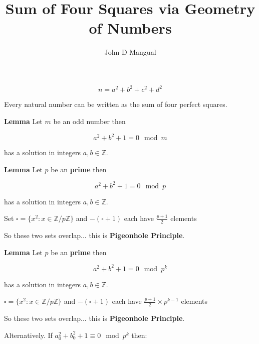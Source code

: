 \documentclass[12pt]{article}
\title{\textbf{ Sum of Four Squares via Geometry of Numbers }}
\author{John D Mangual}
\date{}
\begin{document}
\selectfont \fontsize{25}{30}\selectfont

\maketitle

\noindent $$ n = a^2 + b^2 + c^2 + d^2 $$

\noindent Every natural number can be written as the sum of four perfect squares.

\newpage

\noindent \textbf{Lemma} \newline \newline Let $m$ be an odd number then

$$ a^2 + b^2 + 1 = 0 \mod m $$

\noindent has a solution in integers $a,b \in \mathbb{Z}$.

\newpage

\noindent \textbf{Lemma} \newline \newline Let $p$ be an \textbf{prime} then

$$ a^2 + b^2 + 1 = 0 \mod p $$

\noindent has a solution in integers $a,b \in \mathbb{Z}$. \newline

\noindent Set $\square = \{ x^2 : x \in \mathbb{Z}/p\mathbb{Z} \}$ and $-(\square + 1)$ each have $\frac{p+1}{2}$ elements \newline

\noindent So these two sets overlap... this is \textbf{Pigeonhole Principle}.

\newpage

\noindent \textbf{Lemma} \newline \newline Let $p$ be an \textbf{prime} then

$$ a^2 + b^2 + 1 = 0 \mod p^k $$

\noindent has a solution in integers $a,b \in \mathbb{Z}$. \newline

\noindent $\square = \{ x^2 : x \in \mathbb{Z}/p\mathbb{Z} \}$ and $-(\square + 1)$ each have $\frac{p+1}{2} \times p^{k-1}$ elements \newline

\noindent So these two sets overlap... this is \textbf{Pigeonhole Principle}. \newline

\noindent Alternatively.  If $a_0^2 + b_0^2 + 1 \equiv 0 \mod p^k$ then:
\end{document}

